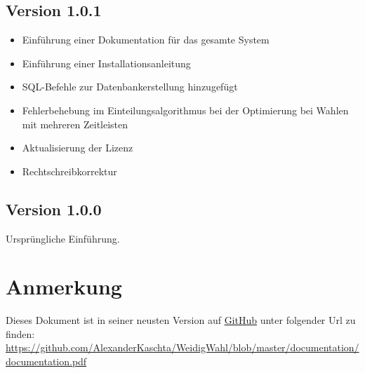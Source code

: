 \documentclass[ngerman]{ltxdoc}
\begin{document}
\subsection*{Version 1.0.1}
\label{subsec:ver_1.0.1}

\begin{itemize}
  \item Einführung einer Dokumentation für das gesamte System
  \item Einführung einer Installationsanleitung
  \item SQL-Befehle zur Datenbankerstellung hinzugefügt
  \item Fehlerbehebung im Einteilungsalgorithmus bei der Optimierung bei Wahlen
  mit mehreren Zeitleisten
  \item Aktualisierung der Lizenz
  \item Rechtschreibkorrektur
\end{itemize}

\subsection*{Version 1.0.0}
\label{subsec:ver_1.0.0}

Ursprüngliche Einführung.

\section*{Anmerkung}

Dieses Dokument ist in seiner neusten Version auf \href{https://github.com/AlexanderKaschta/WeidigWahl}{GitHub} unter
folgender Url zu finden: \href{https://github.com/AlexanderKaschta/WeidigWahl/blob/master/documentation/documentation.pdf}{\url{https://github.com/AlexanderKaschta/WeidigWahl/blob/master/documentation/documentation.pdf}}
\end{document}
